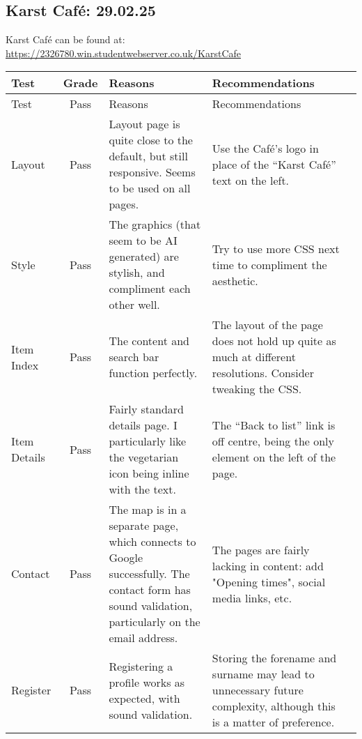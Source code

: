 \documentclass{article}
\begin{document}
\subsection{Karst Café: 29.02.25}
Karst Café can be found at: \url{https://2326780.win.studentwebserver.co.uk/KarstCafe}
  \begin{adjustwidth}{-2cm}{-2cm}
  \begin{center} %
    \begin{longtable}{|p{1.2cm}|c|p{5cm}|p{5cm}|c|}
      \hline Test & Grade & Reasons & Recommendations \\ \hline 
      \endfirsthead
      
      \hline Test & Pass & Reasons & Recommendations \\ \hline 
      \endhead

      Layout & Pass & 
      Layout page is quite close to the default, but still responsive. Seems to be used on all pages. &
      Use the Café's logo in place of the ``Karst Café'' text on the left. \\ \hline 

      Style & Pass & 
      The graphics (that seem to be AI generated) are stylish, and compliment each other well. &
      Try to use more CSS next time to compliment the aesthetic. \\ \hline
     
      Item Index & Pass &
      The content and search bar function perfectly. &
      The layout of the page does not hold up quite as much at different resolutions. Consider tweaking the CSS. \\ \hline

      Item Details & Pass &
      Fairly standard details page. I particularly like the vegetarian icon being inline with the text. &
      The ``Back to list'' link is off centre, being the only element on the left of the page. \\ \hline
      
      Contact & Pass &
      The map is in a separate page, which connects to Google successfully. The contact form has sound validation, particularly on the email address. &
      The pages are fairly lacking in content: add "Opening times", social media links, etc. \\ \hline
      
      Register & Pass &
      Registering a profile works as expected, with sound validation. &
      Storing the forename and surname may lead to unnecessary future complexity, although this is a matter of preference. \\ \hline
      

\end{longtable}
\end{center}
\end{adjustwidth}
\end{document}
